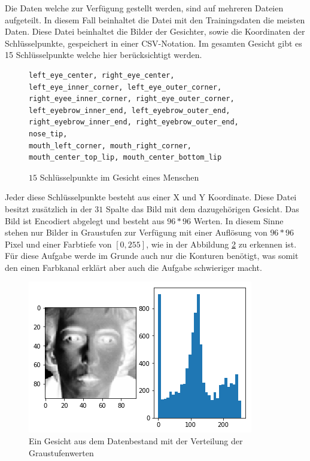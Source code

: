 Die Daten welche zur Verfügung gestellt werden, sind auf mehreren Dateien aufgeteilt. 
In diesem Fall beinhaltet die Datei mit den Trainingsdaten die meisten Daten. 
Diese Datei beinhaltet die Bilder der Gesichter, sowie die Koordinaten der Schlüsselpunkte, gespeichert in einer CSV-Notation.
Im gesamten Gesicht gibt es 15 Schlüsselpunkte welche hier berücksichtigt werden. 
\begin{figure}[ht!]
\lstset{language=Python}
\begin{lstlisting}
left_eye_center, right_eye_center, 
left_eye_inner_corner, left_eye_outer_corner, right_eyee_inner_corner, right_eye_outer_corner, 
left_eyebrow_inner_end, left_eyebrow_outer_end, right_eyebrow_inner_end, right_eyebrow_outer_end, 
nose_tip, 
mouth_left_corner, mouth_right_corner, 
mouth_center_top_lip, mouth_center_bottom_lip
\end{lstlisting}
	\caption{$15$ Schlüsselpunkte im Gesicht eines Menschen}
	\label{fig:15keypoints}
\end{figure}
Jeder diese Schlüsselpunkte besteht aus einer X und Y Koordinate. 
Diese Datei besitzt zusätzlich in der $31$ Spalte das Bild mit dem dazugehörigen Gesicht.
Das Bild ist Encodiert abgelegt und besteht aus $96 * 96$ Werten. 
In diesem Sinne stehen nur Bilder in Graustufen zur Verfügung mit einer Auflösung von $96 * 96$ Pixel und einer Farbtiefe von $[0, 255]$, wie in der Abbildung \ref{fig:ausgangsdaten} zu erkennen ist. 
Für diese Aufgabe werde im Grunde auch nur die Konturen benötigt, was somit den einen Farbkanal erklärt aber auch die Aufgabe schwieriger macht. 
\begin{figure}
	\centering
	\includegraphics[scale=0.8]{images/ausgangsDaten.png}
	\caption{Ein Gesicht aus dem Datenbestand mit der Verteilung der Graustufenwerten}
	\label{fig:ausgangsdaten}
\end{figure}
